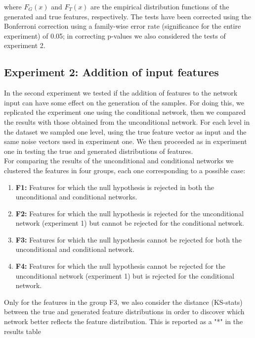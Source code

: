 where $F_{G}(x)$ and $F_{T}(x)$ are the empirical distribution functions of the generated and true features, respectively. The tests have been corrected using the Bonferroni correction using a family-wise error rate (significance for the entire experiment) of 0.05; in correcting p-values we also considered the tests of experiment 2.   %

\subsection{Experiment 2: Addition of input features}
In the second experiment we tested if the addition of features to the network input can have some effect on the generation of the samples. For doing this, we replicated the experiment one using the conditional network, then we compared the results with those obtained from the unconditional network. For each level in the dataset we sampled one level, using the true feature vector as input and %
the same noise vectors used in experiment one. We then proceeded as in experiment one in testing the true and generated distributions of features. \\
For comparing the results of the unconditional and conditional networks we clustered the features in four groups, each one corresponding to a possible case: \\
\begin{enumerate}
	\item \textbf{F1:} Features for which the null hypothesis is rejected in both the unconditional and conditional networks. 
	\item \textbf{F2:} Features for which the null hypothesis is rejected for the unconditional network (experiment 1) but cannot be rejected for the conditional network. 
	\item \textbf{F3:} Features for which the null hypothesis cannot be rejected for both the unconditional  and conditional network.
	\item \textbf{F4:} Features for which the null hypothesis cannot be rejected for the unconditional network (experiment 1) but is rejected for the conditional network.
\end{enumerate}

Only for the features in the group F3, we also consider the distance (KS-stats) between the true and generated feature distributions in order to discover which network better reflects the feature distribution. This is reported as a "*" in the results table %

